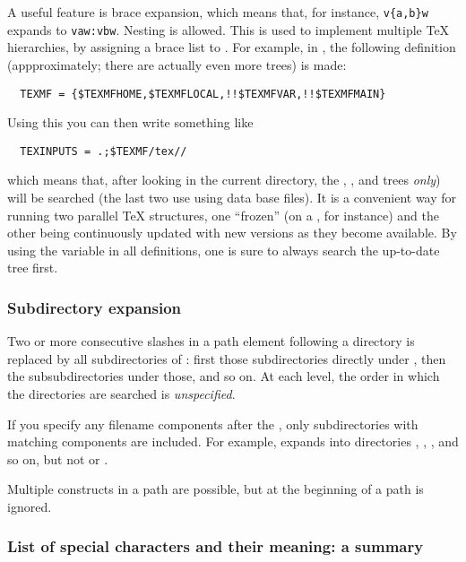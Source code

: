 \documentclass{article}
\begin{document}
A useful feature is brace expansion, which means that, for instance,
\verb+v{a,b}w+ expands to \verb+vaw:vbw+. Nesting is allowed.
This is used to implement multiple \TeX{} hierarchies, by
assigning a brace list to .
For example, in , the following definition
(appproximately; there are actually even more trees) is made:
\begin{verbatim}
  TEXMF = {$TEXMFHOME,$TEXMFLOCAL,!!$TEXMFVAR,!!$TEXMFMAIN}
\end{verbatim}
Using this you can then write something like
\begin{verbatim}
  TEXINPUTS = .;$TEXMF/tex//
\end{verbatim}
which means that, after looking in the current directory, the
, , 
and  trees \emph{only}) will be searched (the
last two use using  data base files). It is a convenient
way for running two parallel \TeX{} structures, one ``frozen'' (on a
\CD, for instance) and the other being continuously updated with new
versions as they become available.  By using the 
variable in all definitions, one is sure to always search the
up-to-date tree first.

\subsubsection{Subdirectory expansion}
\label{sec:subdirectory-expansion}

Two or more consecutive slashes in a path element following a directory
 is replaced by all subdirectories of : first those
subdirectories directly under , then the subsubdirectories under
those, and so on.  At each level, the order in which the directories are
searched is \emph{unspecified}.

If you specify any filename components after the \samp{//}, only
subdirectories with matching components are included.  For example,
 expands into directories , ,
, and so on, but not  or .

Multiple \samp{//} constructs in a path are possible, but
\samp{//} at the beginning of a path is ignored.

\subsubsection{List of special characters and their meaning: a summary}
\end{document}
